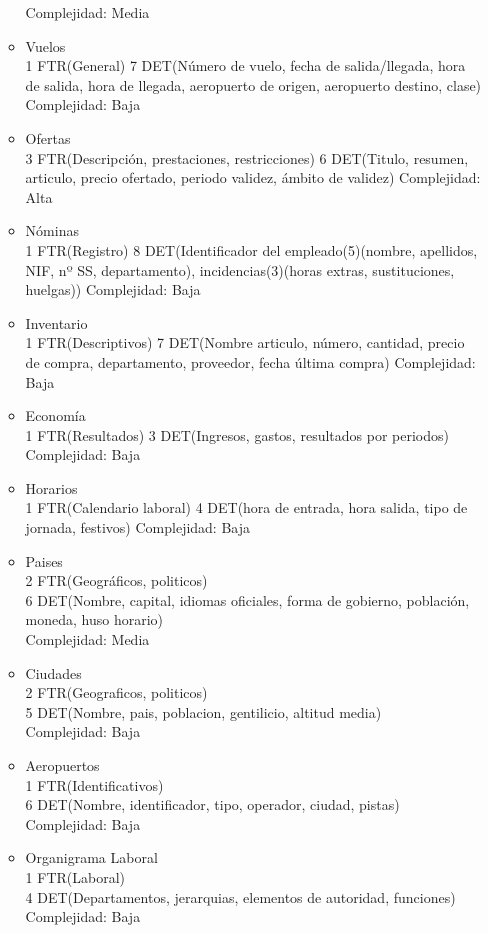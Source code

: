 \begin{enumerate}
\begin{itemize}
			Complejidad: Media\\
		\item Vuelos\\
			1 FTR(General)
			7 DET(Número de vuelo, fecha de salida/llegada, hora de salida, hora de llegada, aeropuerto de origen, aeropuerto destino,
			clase)
			Complejidad: Baja\\
		\item Ofertas\\
			3 FTR(Descripción, prestaciones, restricciones)
			6 DET(Titulo, resumen, articulo, precio ofertado, periodo validez, ámbito de validez)
			Complejidad: Alta\\
		\item Nóminas\\
			1 FTR(Registro)
			8 DET(Identificador del empleado(5)(nombre, apellidos, NIF, nº SS, departamento), incidencias(3)(horas extras,
			sustituciones, huelgas))
			Complejidad: Baja\\
		\item Inventario\\
			1 FTR(Descriptivos)
			7 DET(Nombre articulo, número, cantidad, precio de compra, departamento, proveedor, fecha última compra)
			Complejidad: Baja\\
		\item Economía\\
			1 FTR(Resultados)
			3 DET(Ingresos, gastos, resultados por periodos)
			Complejidad: Baja\\
		\item Horarios\\
			1 FTR(Calendario laboral)
			4 DET(hora de entrada, hora salida, tipo de jornada, festivos)
			Complejidad: Baja\\
		\item Paises \\
			2 FTR(Geográficos, politicos) \\
			6 DET(Nombre, capital, idiomas oficiales, forma de gobierno, población, moneda, huso horario) \\
			Complejidad: Media\\	
		\item Ciudades \\
			2 FTR(Geograficos, politicos) \\
			5 DET(Nombre, pais, poblacion, gentilicio, altitud media) \\
			Complejidad: Baja\\
		\item Aeropuertos \\
			1 FTR(Identificativos) \\
			6 DET(Nombre, identificador, tipo, operador, ciudad, pistas) \\
			Complejidad: Baja\\
		\item Organigrama Laboral \\
			1 FTR(Laboral) \\
			4 DET(Departamentos, jerarquias, elementos de autoridad, funciones) \\
			Complejidad: Baja\\	
	\end{itemize}		
\end{enumerate}
